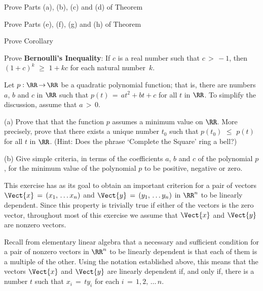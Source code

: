 \V
\V



\noindent \ExBs Prove Parts (a), (b), (c) and (d) of Theorem~  %

\V
\V

\noindent \ExBt Prove Parts (e), (f), (g) and (h) of Theorem~  %

\V
\V

\noindent \ExBu Prove Corollary~  %

\V
\V


\noindent \ExBv Prove {\bf Bernoulli's Inequality}: If $c$ is a real number such that $c\,>\,-1$, then $(1+c)^{k}\,\,{\geq}\,\,1+kc$ for each natural number~$k$.

\V
\V

\noindent \ExBw Let $p:{\RR} \,{\rightarrow}\, {\RR}$ be a quadratic polynomial function;
    that is, there are numbers $a$, $b$ and $c$ in ${\RR}$ such that $p(t) \,=\, at^{2} + bt + c$ for all $t$ in ${\RR}$.
    To simplify the discussion, assume that $a\,>\,0$.

\V

        (a) Prove that that the function $p$ assumes a minimum value on ${\RR}$.
    More precisely, prove that there exists a unique number $t_{0}$ such that $p(t_{0})\,\,{\leq}\,\,p(t)$ for all $t$ in ${\RR}$.
    (Hint: Does the phrase `Complete the Square' ring a bell?)

\V

        (b) Give simple criteria, in terms of the coefficients $a$, $b$ and $c$ of the polynomial $p$,
    for the minimum value of the polynomial $p$ to be positive, negative or zero.

\V
\V

\noindent \ExBx This exercise has as its goal to obtain an important criterion for a pair of vectors $\Vect{x} \,=\, (x_{1},\,{\ldots}\,x_{n})$ and $\Vect{y} \,=\, (y_{1},\,{\ldots}\,y_{n})$ in ${\RR}^{n}$ to be linearly dependent.
    Since this property is trivially true if either of the vectors is the zero vector,
    throughout most of this exercise we assume that $\Vect{x}$ and $\Vect{y}$ are nonzero vectors.

        Recall from elementary linear algebra that a necessary and sufficient condition for a pair of nonzero vectors in ${\RR}^{n}$ to be linearly dependent is that each of them is a multiple of the other.
    Using the notation established above, this means that the vectors $\Vect{x}$ and $\Vect{y}$ are linearly dependent if, and only if, there is a number $t$ such that $x_{i} \,=\, ty_{i}$ for each $i \,=\, 1,2,\,{\ldots}\,n$.

